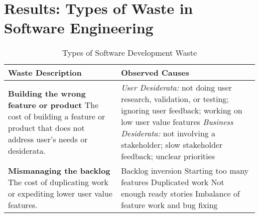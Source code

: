 \section{Results: Types of Waste in Software Engineering}
\label{SEWaste}


\begin{table*}[htbp]
\renewcommand{\arraystretch}{1.3}
\centering
\caption{Types of Software Development Waste}
\label{Waste}
\begin{tabular}{|p{2.5in}|p{3.6in}|} %
\hline
\textbf{Waste} \newline Description                                                                                                         & Observed Causes                                                                                                                                                                                                                                                                                                                                                                                                                     \\ \hline
\textbf{Building the wrong feature or product} \newline
The cost of building a feature or product that does not address user's needs or desiderata.                                  & \textit{User Desiderata:} not doing user research, validation, or testing; ignoring user feedback; working on low user value features \newline \textit{Business Desiderata:} not involving a stakeholder; slow stakeholder feedback; unclear priorities                                                                                                                                                                                  \\ \hline
\textbf{Mismanaging the backlog  } \newline The cost of duplicating work or expediting lower user value features.                                                       & Backlog inversion \newline Starting too many features \newline Duplicated work \newline Not enough ready stories  \newline Imbalance of feature work and bug fixing                                                                                                                                                                                                                                                                                                                                      \\ \hline

\end{tabular}
\end{table*}
